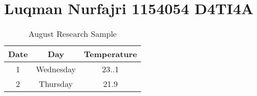 \section{Luqman Nurfajri 1154054 D4TI4A}
\begin{table}[h]
\caption{August Research Sample}
\centering
\begin{tabular}{ccc}
\hline
Date & Day & Temperature \\
\hline
1 & Wednesday & 23..1 \\
2 & Thursday & 21.9 \\
\hline
\end{tabular}
\label{table2}
\end{table}


